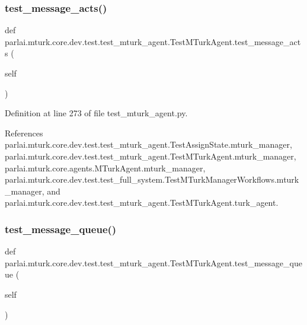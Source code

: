 \subsubsection{\texorpdfstring{test\+\_\+message\+\_\+acts()}{test\_message\_acts()}}
{\footnotesize\ttfamily def parlai.\+mturk.\+core.\+dev.\+test.\+test\+\_\+mturk\+\_\+agent.\+Test\+M\+Turk\+Agent.\+test\+\_\+message\+\_\+acts (\begin{DoxyParamCaption}\item[{}]{self }\end{DoxyParamCaption})}



Definition at line 273 of file test\+\_\+mturk\+\_\+agent.\+py.



References parlai.\+mturk.\+core.\+dev.\+test.\+test\+\_\+mturk\+\_\+agent.\+Test\+Assign\+State.\+mturk\+\_\+manager, parlai.\+mturk.\+core.\+dev.\+test.\+test\+\_\+mturk\+\_\+agent.\+Test\+M\+Turk\+Agent.\+mturk\+\_\+manager, parlai.\+mturk.\+core.\+agents.\+M\+Turk\+Agent.\+mturk\+\_\+manager, parlai.\+mturk.\+core.\+dev.\+test.\+test\+\_\+full\+\_\+system.\+Test\+M\+Turk\+Manager\+Workflows.\+mturk\+\_\+manager, and parlai.\+mturk.\+core.\+dev.\+test.\+test\+\_\+mturk\+\_\+agent.\+Test\+M\+Turk\+Agent.\+turk\+\_\+agent.

\mbox{\label{classparlai_1_1mturk_1_1core_1_1dev_1_1test_1_1test__mturk__agent_1_1TestMTurkAgent_a2b8a45bfee86cdd9e2a5ae10905b6334}} 
\subsubsection{\texorpdfstring{test\+\_\+message\+\_\+queue()}{test\_message\_queue()}}
{\footnotesize\ttfamily def parlai.\+mturk.\+core.\+dev.\+test.\+test\+\_\+mturk\+\_\+agent.\+Test\+M\+Turk\+Agent.\+test\+\_\+message\+\_\+queue (\begin{DoxyParamCaption}\item[{}]{self }\end{DoxyParamCaption})}

